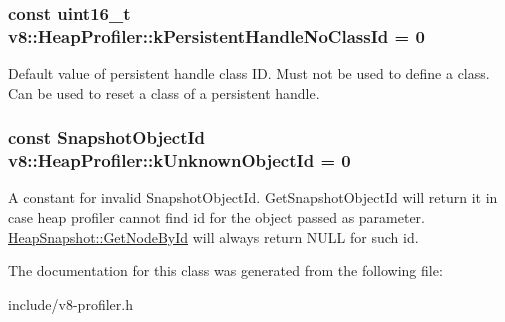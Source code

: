 \subsubsection[{\texorpdfstring{k\+Persistent\+Handle\+No\+Class\+Id}{kPersistentHandleNoClassId}}]{\setlength{\rightskip}{0pt plus 5cm}const uint16\+\_\+t v8\+::\+Heap\+Profiler\+::k\+Persistent\+Handle\+No\+Class\+Id = 0\hspace{0.3cm}{\ttfamily [static]}}\hypertarget{classv8_1_1_heap_profiler_a272c9af3ea5cd90a2737af3d22a7eb78}{}\label{classv8_1_1_heap_profiler_a272c9af3ea5cd90a2737af3d22a7eb78}
Default value of persistent handle class ID. Must not be used to define a class. Can be used to reset a class of a persistent handle. 
\subsubsection[{\texorpdfstring{k\+Unknown\+Object\+Id}{kUnknownObjectId}}]{\setlength{\rightskip}{0pt plus 5cm}const Snapshot\+Object\+Id v8\+::\+Heap\+Profiler\+::k\+Unknown\+Object\+Id = 0\hspace{0.3cm}{\ttfamily [static]}}\hypertarget{classv8_1_1_heap_profiler_abf2b9d8facb18473f9b124ab8baf5786}{}\label{classv8_1_1_heap_profiler_abf2b9d8facb18473f9b124ab8baf5786}
A constant for invalid Snapshot\+Object\+Id. Get\+Snapshot\+Object\+Id will return it in case heap profiler cannot find id for the object passed as parameter. \hyperlink{classv8_1_1_heap_snapshot_a023696f94fe538380922bf2c40c97b7b}{Heap\+Snapshot\+::\+Get\+Node\+By\+Id} will always return N\+U\+LL for such id. 

The documentation for this class was generated from the following file\+:\begin{DoxyCompactItemize}
\item 
include/v8-\/profiler.\+h\end{DoxyCompactItemize}
